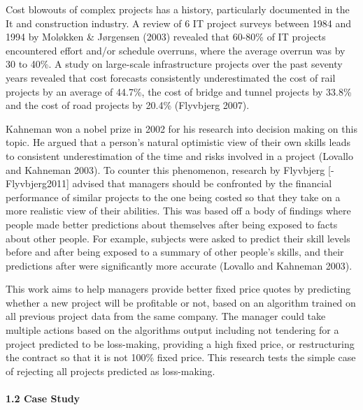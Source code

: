 \documentclass[]{elsarticle} %
\begin{document}
Cost blowouts of complex projects has a history, particularly documented
in the It and construction industry. A review of 6 IT project surveys
between 1984 and 1994 by Moløkken \& Jørgensen (2003) revealed that
60-80\% of IT projects encountered effort and/or schedule overruns,
where the average overrun was by 30 to 40\%. A study on large-scale
infrastructure projects over the past seventy years revealed that cost
forecasts consistently underestimated the cost of rail projects by an
average of 44.7\%, the cost of bridge and tunnel projects by 33.8\% and
the cost of road projects by 20.4\% (Flyvbjerg 2007).

Kahneman won a nobel prize in 2002 for his research into decision making
on this topic. He argued that a person's natural optimistic view of
their own skills leads to consistent underestimation of the time and
risks involved in a project (Lovallo and Kahneman 2003). To counter this
phenomenon, research by Flyvbjerg {[}-Flyvbjerg2011{]} advised that
managers should be confronted by the financial performance of similar
projects to the one being costed so that they take on a more realistic
view of their abilities. This was based off a body of findings where
people made better predictions about themselves after being exposed to
facts about other people. For example, subjects were asked to predict
their skill levels before and after being exposed to a summary of other
people's skills, and their predictions after were significantly more
accurate (Lovallo and Kahneman 2003).

This work aims to help managers provide better fixed price quotes by
predicting whether a new project will be profitable or not, based on an
algorithm trained on all previous project data from the same company.
The manager could take multiple actions based on the algorithms output
including not tendering for a project predicted to be loss-making,
providing a high fixed price, or restructuring the contract so that it
is not 100\% fixed price. This research tests the simple case of
rejecting all projects predicted as loss-making.

\paragraph{1.2 Case Study}\label{case-study}
\end{document}
